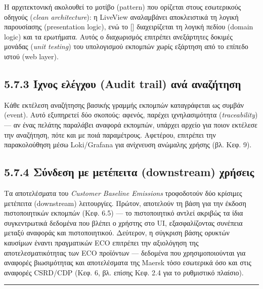 \documentclass[11pt,a4paper,greek,twoside]{template-xe}
\let\origtexttt\texttt
\renewcommand{\texttt}[1]{%
  \begingroup
  \StrSubstitute{#1}{.}{.\allowbreak}[\tttmp]%
  \origtexttt{\tttmp}%
  \endgroup
}
\begin{document}
Η αρχιτεκτονική ακολουθεί το μοτίβο (pattern) που ορίζεται στους
εσωτερικούς οδηγούς (\emph{clean architecture}): η LiveView αναλαμβάνει
αποκλειστικά τη λογική παρουσίασης (presentation logic), ενώ το
\texttt{BaselineEmissionsReport} διαχειρίζεται τη λογική πεδίου (domain
logic) και τα ερωτήματα. Αυτός ο διαχωρισμός επιτρέπει ανεξάρτητες
δοκιμές μονάδας (\emph{unit testing}) του υπολογισμού εκπομπών χωρίς
εξάρτηση από το επίπεδο ιστού (web layer).

\subsection{5.7.3 Ίχνος ελέγχου (Audit trail) ανά
αναζήτηση}\label{ux3afux3c7ux3bdux3bfux3c2-ux3b5ux3bbux3adux3b3ux3c7ux3bfux3c5-audit-trail-ux3b1ux3bdux3ac-ux3b1ux3bdux3b1ux3b6ux3aeux3c4ux3b7ux3c3ux3b7}

Κάθε εκτέλεση αναζήτησης βασικής γραμμής εκπομπών καταγράφεται ως συμβάν
(event). Αυτό εξυπηρετεί δύο σκοπούς: αφενός, παρέχει ιχνηλασιμότητα
(\emph{traceability}) --- αν ένας πελάτης παραλάβει αναφορά εκπομπών,
υπάρχει αρχείο για ποιον εκτέλεσε την αναζήτηση, πότε και με ποιά
παραμέτρους. Αφετέρου, επιτρέπει την παρακολούθηση μέσω Loki/Grafana για
ανίχνευση ανώμαλης χρήσης (βλ. Κεφ. 9).

\subsection{5.7.4 Σύνδεση με μετέπειτα (downstream)
χρήσεις}\label{ux3c3ux3cdux3bdux3b4ux3b5ux3c3ux3b7-ux3bcux3b5-ux3bcux3b5ux3c4ux3adux3c0ux3b5ux3b9ux3c4ux3b1-downstream-ux3c7ux3c1ux3aeux3c3ux3b5ux3b9ux3c2}

Τα αποτελέσματα του \emph{Customer Baseline Emissions} τροφοδοτούν δύο
κρίσιμες μετέπειτα (downstream) λειτουργίες. Πρώτον, αποτελούν τη βάση
για την έκδοση πιστοποιητικών εκπομπών (Κεφ. 6.5) --- το πιστοποιητικό
αντλεί ακριβώς τα ίδια συγκεντρωτικά δεδομένα που βλέπει ο χρήστης στο
UI, εξασφαλίζοντας συνέπεια μεταξύ αναφοράς και πιστοποιητικού.
Δεύτερον, η σύγκριση βάσης ορυκτών καυσίμων έναντι πραγματικών ECO
επιτρέπει την αξιολόγηση της αποτελεσματικότητας των ECO προϊόντων ---
δεδομένα που χρησιμοποιούνται για αναφορές βιωσιμότητας και αποτελέσματα
της Maersk τόσο εσωτερικά όσο και στις αναφορές CSRD/CDP (Κεφ. 6, βλ.
επίσης Κεφ. 2.4 για το ρυθμιστικό πλαίσιο).

\begin{center}\rule{0.5\linewidth}{0.5pt}\end{center}
\end{document}
